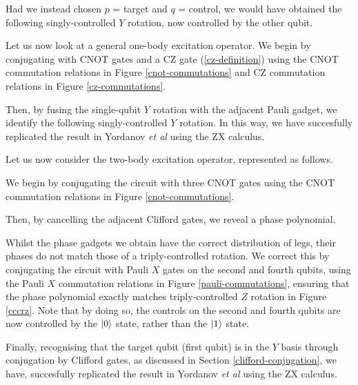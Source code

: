 Had we instead chosen $p$ = target and $q$ = control, we would have obtained the following singly-controlled $Y$ rotation, now controlled by the other qubit.


Let us now look at a general one-body excitation operator. We begin by conjugating with CNOT gates and a CZ gate (\ref{cz-definition}) using the CNOT commutation relations in Figure \ref{cnot-commutations} and CZ commutation relations in Figure \ref{cz-commutations}.


Then, by fusing the single-qubit $Y$ rotation with the adjacent Pauli gadget, we identify the following singly-controlled $Y$ rotation. In this way, we have succesfully replicated the result in Yordanov \textit{et al} \cite{Yordanov2020} using the ZX calculus.


Let us now consider the two-body excitation operator, represented as follows.


We begin by conjugating the circuit with three CNOT gates using the CNOT commutation relations in Figure \ref{cnot-commutations}.


Then, by cancelling the adjacent Clifford gates, we reveal a phase polynomial.


Whilst the phase gadgets we obtain have the correct distribution of legs, their phases do not match those of a triply-controlled rotation. We correct this by conjugating the circuit with Pauli $X$ gates on the second and fourth qubits, using the Pauli $X$ commutation relations in Figure \ref{pauli-commutations}, ensuring that the phase polynomial exactly matches triply-controlled $Z$ rotation in Figure \ref{cccrz}. Note that by doing so, the controls on the second and fourth qubits are now controlled by the $\ket 0$ state, rather than the $\ket 1$ state.


Finally, recognising that the target qubit (first qubit) is in the $Y$ basis through conjugation by Clifford gates, as discussed in Section \ref{clifford-conjugation}, we have, succesfully replicated the result in Yordanov \textit{et al} \cite{Yordanov2020} using the ZX calculus.

